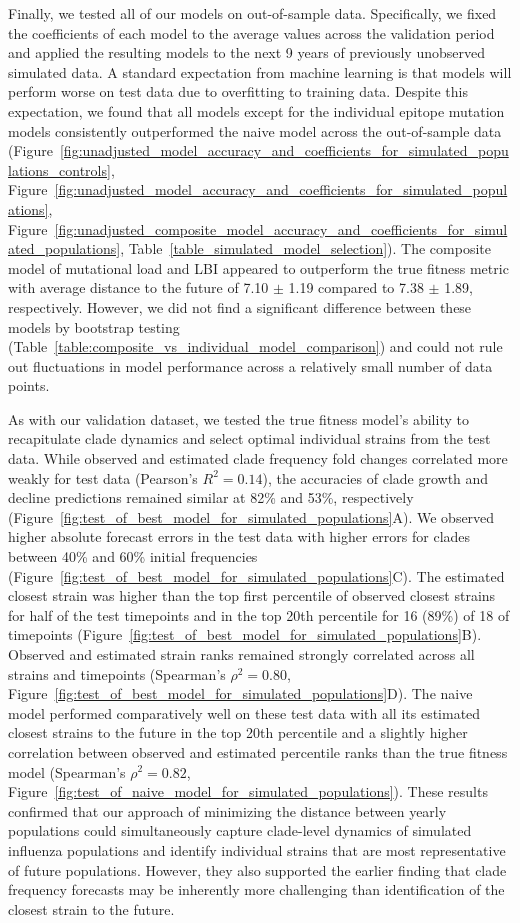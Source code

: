 Finally, we tested all of our models on out-of-sample data.
Specifically, we fixed the coefficients of each model to the average values across the validation period and applied the resulting models to the next 9 years of previously unobserved simulated data.
A standard expectation from machine learning is that models will perform worse on test data due to overfitting to training data.
Despite this expectation, we found that all models except for the individual epitope mutation models consistently outperformed the naive model across the out-of-sample data (Figure~\ref{fig:unadjusted_model_accuracy_and_coefficients_for_simulated_populations_controls}, Figure~\ref{fig:unadjusted_model_accuracy_and_coefficients_for_simulated_populations}, Figure~\ref{fig:unadjusted_composite_model_accuracy_and_coefficients_for_simulated_populations}, Table~\ref{table_simulated_model_selection}).
The composite model of mutational load and LBI appeared to outperform the true fitness metric with average distance to the future of 7.10 $\pm$ 1.19 compared to 7.38 $\pm$ 1.89, respectively.
However, we did not find a significant difference between these models by bootstrap testing (Table~\ref{table:composite_vs_individual_model_comparison}) and could not rule out fluctuations in model performance across a relatively small number of data points.

As with our validation dataset, we tested the true fitness model's ability to recapitulate clade dynamics and select optimal individual strains from the test data.
While observed and estimated clade frequency fold changes correlated more weakly for test data (Pearson's $R^2 = 0.14$), the accuracies of clade growth and decline predictions remained similar at 82\% and 53\%, respectively (Figure~\ref{fig:test_of_best_model_for_simulated_populations}A).
We observed higher absolute forecast errors in the test data with higher errors for clades between 40\% and 60\% initial frequencies (Figure~\ref{fig:test_of_best_model_for_simulated_populations}C).
The estimated closest strain was higher than the top first percentile of observed closest strains for half of the test timepoints and in the top 20th percentile for 16 (89\%) of 18 of timepoints (Figure~\ref{fig:test_of_best_model_for_simulated_populations}B).
Observed and estimated strain ranks remained strongly correlated across all strains and timepoints (Spearman's $\rho^2 = 0.80$, Figure~\ref{fig:test_of_best_model_for_simulated_populations}D).
The naive model performed comparatively well on these test data with all its estimated closest strains to the future in the top 20th percentile and a slightly higher correlation between observed and estimated percentile ranks than the true fitness model (Spearman's $\rho^2 = 0.82$, Figure~\ref{fig:test_of_naive_model_for_simulated_populations}).
These results confirmed that our approach of minimizing the distance between yearly populations could simultaneously capture clade-level dynamics of simulated influenza populations and identify individual strains that are most representative of future populations.
However, they also supported the earlier finding that clade frequency forecasts may be inherently more challenging than identification of the closest strain to the future.


